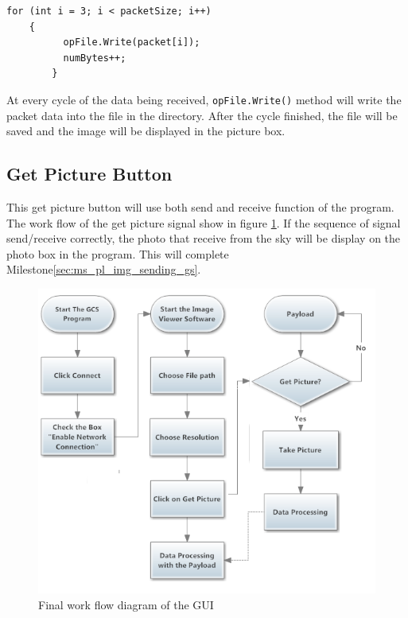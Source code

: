 \begin{lstlisting}[caption={writing binary file},label=lst:writingb]          
	for (int i = 3; i < packetSize; i++)
	{
          opFile.Write(packet[i]);
          numBytes++;
    	}
\end{lstlisting}         

At every cycle of the data being received, \texttt{opFile.Write()} method will write the packet data into the file in the directory. After the cycle finished, the file will be saved and the image will be displayed in the picture box. 

\subsection{Get Picture Button}
This get picture button will use both send and receive function of the program. 
The work flow of the get picture signal show in figure \ref{GUI_finalWorkFlow}.
If the sequence of signal send/receive correctly, the photo that receive from the sky will be display on the photo box in the program.
This will complete Milestone\ref{sec:ms_pl_img_sending_gs}.

\begin{figure}[H]
\begin{center}
\includegraphics[scale=1]{figures/finalWorkFlow.png} 
\end{center}
\caption{Final work flow diagram of the GUI\label{GUI_finalWorkFlow}}
\end{figure}

